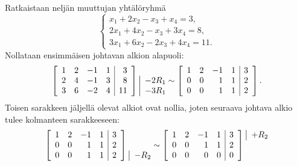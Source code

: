 \documentclass[11pt,a4paper]{amsart}
\begin{document}
  \begin{example}
    Ratkaistaan neljän muuttujan yhtälöryhmä
    \[
      \begin{cases}
        x_1+2x_2-x_3+x_4=3,\\
        2x_1+4x_2-x_3+3x_4=8,\\
        3x_1+6x_2-2x_3+4x_4=11.
      \end{cases}
    \]
    Nollataan ensimmäisen johtavan alkion alapuoli:
    \[
      \left[
        \begin{array}{rrrr|r}
          1&2&-1&1&3\\2&4&-1&3&8\\3&6&-2&4&11
      \end{array}\right]
      \begin{array}{@{}l@{}}\vphantom{0}\\\rowop{-2R_1}\\\rowop{-3R_1}
      \end{array}
      \sim
      \left[
        \begin{array}{rrrr|r}
          1&2&-1&1&3\\0&0&1&1&2\\0&0&1&1&2
      \end{array}\right].
    \]
    Toisen sarakkeen jäljellä olevat alkiot ovat nollia, joten seuraava
    johtava alkio tulee kolmanteen sarakkeeseen:
    \begin{align*}
      \left[
        \begin{array}{rrrr|r}
          1&2&-1&1&3\\0&0&1&1&2\\0&0&1&1&2
      \end{array}\right]
      \begin{array}{@{}l@{}}\vphantom{0}\\\vphantom{0}\\\rowop{-R_2}
      \end{array}
      &\sim
      \left[
        \begin{array}{rrrr|r}
          1&2&-1&1&3\\0&0&1&1&2\\0&0&0&0&0
      \end{array}\right]
      \begin{array}{@{}l@{}}\rowop{+R_2}\\\vphantom{0}\\\vphantom{0}
      \end{array}\\[3pt]

\end{align*}
\end{example}
\end{document}
